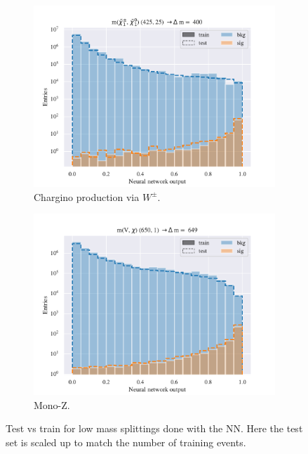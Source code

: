 \begin{figure}[H]
    \begin{subfigure}[t!]{0.49\textwidth}
        \includegraphics[width = \textwidth]{Figures/WW/NN/All_level/High/scaled_train_test_395330.pdf}
        \caption{Chargino production via $W^\pm$.}
        \label{fig:WWNNHigh}
    \end{subfigure}
    \begin{subfigure}[t!]{0.49\textwidth}
        \includegraphics[width = \textwidth]{Figures/Mono_Z/ML/NN/All_level/High/scaled_train_test_310617.pdf}
        \caption{Mono-Z.}
        \label{fig:MonoZNNHigh}
    \end{subfigure}
    \caption{Test vs train for low mass splittings done with the NN. Here the test set is scaled up to match the number of training events.}
    \label{fig:AllHighNN}
\end{figure}

